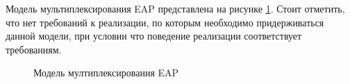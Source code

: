 Модель мультиплексирования EAP представлена на рисунке \ref{img:1}. Стоит отметить, что нет требований к реализации, по которым необходимо придерживаться данной модели, при условии что поведение реализации соответствует требованиям.

\begin{figure}[h]
\caption{Модель мултиплексирования EAP}
\label{img:1}
\end{figure}
